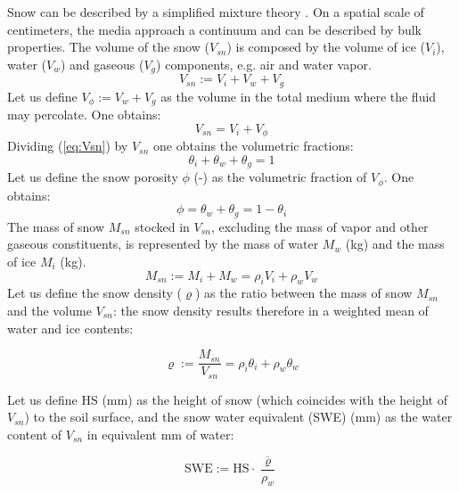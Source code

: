 Snow can be described by a simplified mixture theory \citep{Morris87}. On a spatial scale of centimeters, the media approach a continuum and can be described by bulk properties. The volume of the snow ($V_{sn}$) is composed by the volume of ice ($V_i$), water ($V_w$) and gaseous ($V_g$) components, e.g. air and water vapor. 
\begin{equation}\label{eq:Vsn}
V_{sn}:=V_i + V_w + V_{g}
\end{equation}
Let us define $V_{\phi}:=V_w+V_g$ as the volume in the total medium where the fluid may percolate. One obtains:
\begin{equation}
V_{sn}=V_i + V_{\phi}
\end{equation}
Dividing (\ref{eq:Vsn}) by $V_{sn}$ one obtains the volumetric fractions:
\begin{equation}
\theta_i + \theta_w + \theta_{g}=1
\end{equation}
Let us define the snow porosity $\phi$ (-) as the volumetric fraction of $V_{\phi}$. One obtains:
\begin{equation}
\phi=\theta_w+\theta_g=1-\theta_i
\end{equation}
%
The mass of snow $M_{sn}$ stocked in $V_{sn}$, excluding the mass of vapor and other gaseous constituents, is represented by the mass of water $M_w$ (kg) and the mass of ice $M_i$ (kg). 
\begin{equation}\label{eq:Msn}
M_{sn}:=M_i + M_w=\rho_i V_i + \rho_w V_w
\end{equation}
Let us define the snow density ($\varrho$) as the ratio between the mass of snow $M_{sn}$ and the volume $V_{sn}$: the snow density results therefore in a weighted mean of water and ice contents:

\begin{equation}\label{eq:rho}
\varrho:=\frac{M_{sn}}{V_{sn}}= \rho_i \theta_i + \rho_w \theta_w 
\end{equation}

\noindent Let us define HS (mm) as the height of snow (which coincides with the height of $V_{sn}$) to the soil surface, and the snow water equivalent (SWE) (mm) as the water content of $V_{sn}$ in equivalent mm of water:

\begin{equation}\label{eq:swe1}
\textrm{SWE}:= \textrm{HS} \cdot \frac{\overline \varrho}{\rho_w}
\end{equation}

